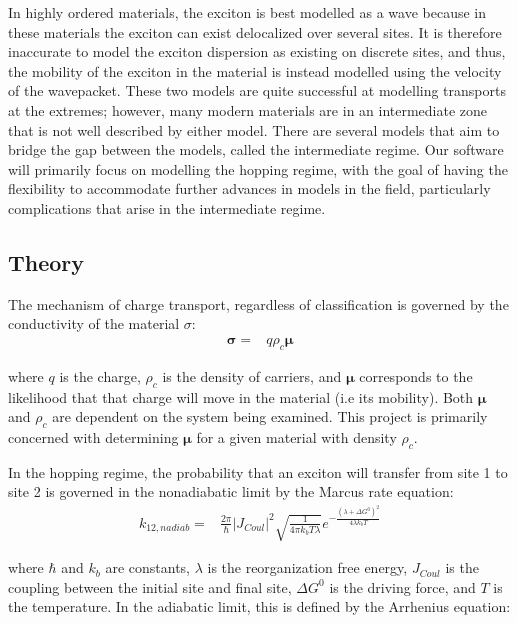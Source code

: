 \documentclass{article}
\begin{document}
In highly ordered materials, the exciton is best modelled as a wave because in these materials the exciton can exist delocalized over several sites.\cite{Oberhofer2017ChargeMethods} It is therefore inaccurate to model the exciton dispersion as existing on discrete sites, and thus, the mobility of the exciton in the material is instead modelled using the velocity of the wavepacket. These two models are quite successful at modelling transports at the extremes; however, many modern materials are in an intermediate zone that is not well described by either model. There are several models that aim to bridge the gap between the models, called the intermediate regime. Our software will primarily focus on modelling the hopping regime, with the goal of having the flexibility to accommodate further advances in models in the field, particularly complications that arise in the intermediate regime.

\subsection{Theory}

The mechanism of charge transport, regardless of classification is governed by the conductivity of the material $\sigma$:
\begin{align}
    \mathbf{\sigma}=&q\rho_c\mathbf{\mu}
\end{align}

where $q$ is the charge, $\rho_c$ is the density of carriers, and $\mathbf{\mu}$ corresponds to the likelihood that that charge will move in the material (i.e its mobility).\cite{Oberhofer2017ChargeMethods} Both $\mathbf{\mu}$ and $\rho_c$ are dependent on the system being examined. This project is primarily concerned with determining $\mathbf{\mu}$ for a given material with density $\rho_c$. 

In the hopping regime, the probability that an exciton will transfer from site 1 to site 2 is governed in the nonadiabatic limit by the Marcus rate equation:\cite{Marcus1956OnIN}
\begin{align}
    k_{12,nadiab}=&\frac{2\pi}{\hbar}|J_{Coul}|^2\sqrt{\frac{1}{4\pi k_b T \lambda}}e^{-\frac{(\lambda +\Delta G^0)^2}{4\lambda k_b T}}
\end{align}

where $\hbar$ and $k_b$ are constants, $\lambda$ is the reorganization free energy, $J_{Coul}$ is the coupling between the initial site and final site, $\Delta G^0$ is the driving force, and $T$ is the temperature. In the adiabatic limit, this is defined by the Arrhenius equation:\cite{Baumeier2012StochasticNetworks}
\end{document}
